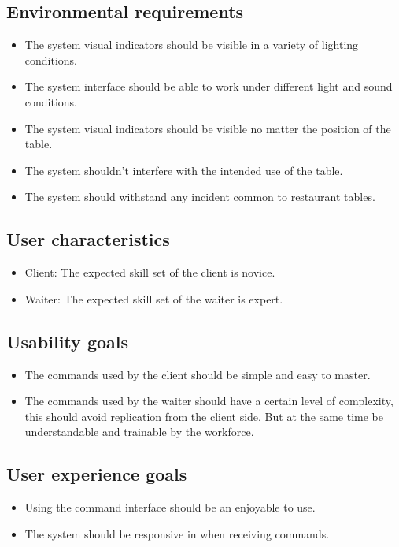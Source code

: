 \documentclass{article}
\begin{document}
\subsection{Environmental requirements}
\begin{itemize}
    \item The system visual indicators should be visible in a variety of lighting conditions.
    \item The system interface should be able to work under different light and sound conditions.
    \item The system visual indicators should be visible no matter the position of the table.
    \item The system shouldn’t interfere with the intended use of the table.
    \item The system should withstand any incident common to restaurant tables.
\end{itemize}
\subsection{User characteristics}
\begin{itemize}
    \item Client: The expected skill set of the client is novice.
    \item Waiter: The expected skill set of the waiter is expert.
\end{itemize}
\subsection{Usability goals}
\begin{itemize}
    \item The commands used by the client should be simple and easy to master.
    \item The commands used by the waiter should have a certain level of complexity, this should avoid replication from the client side. But at the same time be understandable and trainable by the workforce.
\end{itemize}
\subsection{User experience goals}
\begin{itemize}
    \item Using the command interface should be an enjoyable to use.
    \item The system should be responsive in when receiving commands.
\end{itemize}
\end{document}
